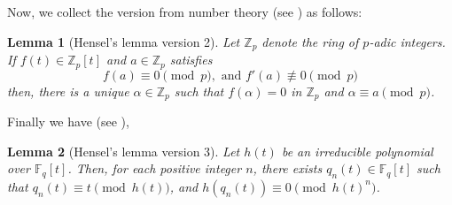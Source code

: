 \documentclass[11pt,twoside]{amsart}
\newcommand{\Z}{\mathbb{Z}}
\newtheorem{lemma}{Lemma}[section]
\theoremstyle{definition} %
\begin{document}
\noindent Now, we collect the version from number theory (see \cite[Theorem 2.1]{ConradHensel}) as follows:
\begin{lemma}[Hensel's lemma version 2]\label{hensel-2}
Let $\Z_p$ denote the ring of $p$-adic integers. If $f(t) \in \Z_p[t]$ and $a \in \Z_p$ satisfies
 $$f(a)\equiv 0 \pmod{p},\text{ and } f'(a)\not\equiv 0 \pmod{p}$$ 
then, there is a unique $\alpha\in \Z_p$ such that $f(\alpha )=0$ in $\Z_p$ and $\alpha\equiv a\pmod{p}$.
\end{lemma}

\noindent Finally we have (see \cite[Lemma 2.3.8]{Singla2010}),  
\begin{lemma}[Hensel's lemma version 3]\label{hensel-3}
Let $h(t)$ be an irreducible polynomial over $\mathbb{F}_q[t]$. Then, for each positive integer $n$, there exists $q_n(t) \in \mathbb{F}_q[t]$ such that $q_n(t) \equiv t \pmod{h(t)}$, and $h(q_n(t)) \equiv 0\pmod{h(t)^n}$.
\end{lemma}

\end{document}
